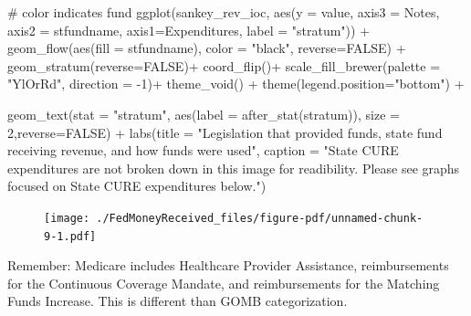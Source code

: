 \documentclass[
  letterpaper,
  DIV=11,
  numbers=noendperiod]{scrreport}
\newenvironment{Shaded}{\begin{snugshade}}{\end{snugshade}}
\newcommand{\AttributeTok}[1]{\textcolor[rgb]{0.40,0.45,0.13}{#1}}
\newcommand{\CommentTok}[1]{\textcolor[rgb]{0.37,0.37,0.37}{#1}}
\newcommand{\ConstantTok}[1]{\textcolor[rgb]{0.56,0.35,0.01}{#1}}
\newcommand{\DecValTok}[1]{\textcolor[rgb]{0.68,0.00,0.00}{#1}}
\newcommand{\FunctionTok}[1]{\textcolor[rgb]{0.28,0.35,0.67}{#1}}
\newcommand{\NormalTok}[1]{\textcolor[rgb]{0.00,0.23,0.31}{#1}}
\newcommand{\SpecialCharTok}[1]{\textcolor[rgb]{0.37,0.37,0.37}{#1}}
\newcommand{\StringTok}[1]{\textcolor[rgb]{0.13,0.47,0.30}{#1}}
\begin{document}
\begin{Shaded}
\begin{Highlighting}[]
\CommentTok{\# color indicates fund}
\FunctionTok{ggplot}\NormalTok{(sankey\_rev\_ioc, }
       \FunctionTok{aes}\NormalTok{(}\AttributeTok{y =}\NormalTok{ value, }\AttributeTok{axis3 =}\NormalTok{ Notes, }\AttributeTok{axis2 =}\NormalTok{ stfundname, }\AttributeTok{axis1=}\NormalTok{Expenditures, }\AttributeTok{label =} \StringTok{"stratum"}\NormalTok{)) }\SpecialCharTok{+}
  \FunctionTok{geom\_flow}\NormalTok{(}\FunctionTok{aes}\NormalTok{(}\AttributeTok{fill =}\NormalTok{ stfundname), }\AttributeTok{color =} \StringTok{"black"}\NormalTok{, }\AttributeTok{reverse=}\ConstantTok{FALSE}\NormalTok{) }\SpecialCharTok{+}
  \FunctionTok{geom\_stratum}\NormalTok{(}\AttributeTok{reverse=}\ConstantTok{FALSE}\NormalTok{)}\SpecialCharTok{+}
\FunctionTok{coord\_flip}\NormalTok{()}\SpecialCharTok{+}
   \FunctionTok{scale\_fill\_brewer}\NormalTok{(}\AttributeTok{palette =} \StringTok{"YlOrRd"}\NormalTok{, }\AttributeTok{direction =} \SpecialCharTok{{-}}\DecValTok{1}\NormalTok{)}\SpecialCharTok{+}
  \FunctionTok{theme\_void}\NormalTok{() }\SpecialCharTok{+}
  \FunctionTok{theme}\NormalTok{(}\AttributeTok{legend.position=}\StringTok{"bottom"}\NormalTok{) }\SpecialCharTok{+}

      \FunctionTok{geom\_text}\NormalTok{(}\AttributeTok{stat =} \StringTok{"stratum"}\NormalTok{, }\FunctionTok{aes}\NormalTok{(}\AttributeTok{label =} \FunctionTok{after\_stat}\NormalTok{(stratum)), }\AttributeTok{size =} \DecValTok{2}\NormalTok{,}\AttributeTok{reverse=}\ConstantTok{FALSE}\NormalTok{) }\SpecialCharTok{+}
   \FunctionTok{labs}\NormalTok{(}\AttributeTok{title =} \StringTok{"Legislation that provided funds, state fund receiving revenue, }
\StringTok{   and how funds were used"}\NormalTok{, }\AttributeTok{caption =} \StringTok{"State CURE expenditures are not broken down in this image for readibility. }
\StringTok{         Please see graphs focused on State CURE expenditures below."}\NormalTok{)}
\end{Highlighting}
\end{Shaded}

\begin{figure}[H]

{\centering \texttt{[image: ./FedMoneyReceived\_files/figure-pdf/unnamed-chunk-9-1.pdf]}

}

\end{figure}

\begin{tcolorbox}[enhanced jigsaw, coltitle=black, titlerule=0mm, leftrule=.75mm, colbacktitle=quarto-callout-important-color!10!white, arc=.35mm, rightrule=.15mm, opacityback=0, colframe=quarto-callout-important-color-frame, toptitle=1mm, opacitybacktitle=0.6, bottomtitle=1mm, title={Important}, colback=white, breakable, toprule=.15mm, left=2mm, bottomrule=.15mm]

Remember: Medicare includes Healthcare Provider Assistance,
reimbursements for the Continuous Coverage Mandate, and reimbursements
for the Matching Funds Increase. This is different than GOMB
categorization.

\end{tcolorbox}
\end{document}

